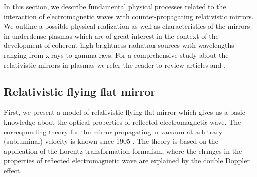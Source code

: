 \documentclass[10pt, a4paper, twoside, openright]{report}
\begin{document}
%

%

%

%

In this section, we describe fundamental physical processes related to the interaction of electromagnetic waves with counter-propagating relativistic mirrors. We outline a possible physical realization as well as characteristics of the mirrors in underdense plasmas which are of great interest in the context of the development of coherent high-brightness radiation sources with wavelengths ranging from x-rays to gamma-rays. For a comprehensive study about the relativistic mirrors in plasmas we refer the reader to review articles  and .


\subsection{Relativistic flying flat mirror\label{sec:rffm}}


First, we present a model of relativistic flying flat mirror which gives us a basic knowledge about the optical properties of reflected electromagnetic wave. The corresponding theory for the mirror propagating in vacuum at arbitrary (subluminal) velocity is known since 1905 \cite{Einstein1905}. The theory is based on the application of the Lorentz transformation formalism, where the changes in the properties of reflected electromagnetic wave are explained by the double Doppler effect.
\end{document}
